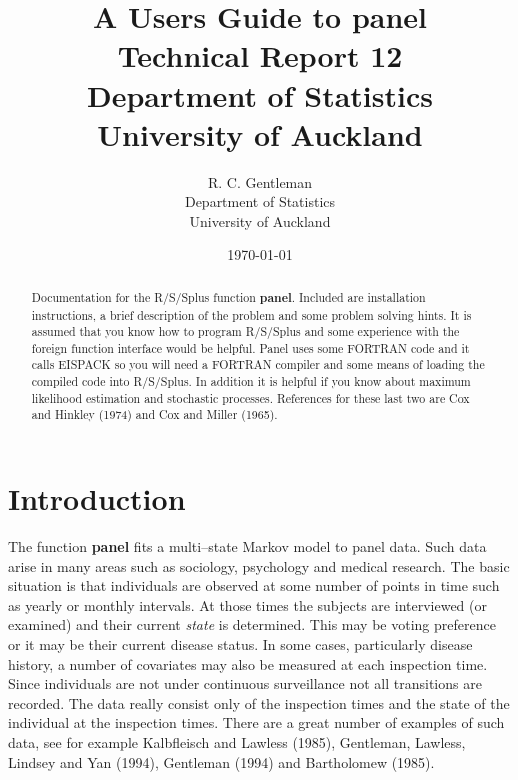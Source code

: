 \documentclass[12pt]{article}
\begin{document}
\title{A Users Guide to {\bf panel}\\
Technical Report 12 \\
Department of Statistics \\
University of Auckland}
\author{R. C. Gentleman \\
Department of Statistics\\
University of Auckland}

\date{\today}
\maketitle

\begin{abstract}

Documentation for the R/S/Splus function {\bf panel}.
Included are installation instructions, a brief description of
the problem and some problem solving hints.
It is assumed that you know how to program R/S/Splus and some
experience with the foreign function interface would be helpful.
Panel uses some FORTRAN code and it calls EISPACK so you will need 
a FORTRAN compiler and some means of loading the compiled code into
R/S/Splus.
In addition it is helpful if you know about maximum likelihood estimation and
stochastic processes.
References for these last two are Cox and Hinkley (1974) and Cox and
Miller (1965).
\end{abstract}

\section{Introduction}

The function {\bf panel} fits a multi--state Markov model to panel data.
Such data arise in many areas such as sociology, psychology and medical
research.
The basic situation is that individuals are observed at some number 
of points in time such as yearly or monthly intervals.
At those times the subjects are interviewed (or examined) and their current
{\em state} is determined. This may be voting preference or it may be
their current disease status.
In some cases, particularly disease history, a number of covariates may
also be measured at each inspection time.
Since individuals are not under continuous surveillance not all transitions
are recorded.
The data really consist only of the inspection times and the state of the
individual at the inspection times. 
There are a great number of examples of such data, see for example Kalbfleisch
and Lawless (1985), Gentleman, Lawless, Lindsey and Yan (1994), 
Gentleman (1994) and Bartholomew (1985).
\end{document}
